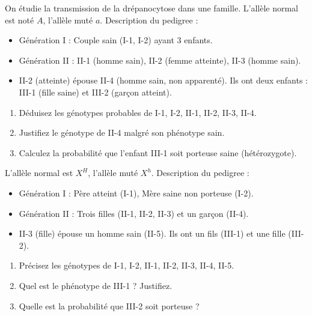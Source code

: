 \documentclass[11pt]{article}
\begin{document}
\begin{exercice}
On étudie la transmission de la drépanocytose dans une famille. L'allèle normal est noté $A$, l'allèle muté $a$.
Description du pedigree :
\begin{itemize}
    \item Génération I : Couple sain (I-1, I-2) ayant 3 enfants.
    \item Génération II : II-1 (homme sain), II-2 (femme atteinte), II-3 (homme sain).
    \item II-2 (atteinte) épouse II-4 (homme sain, non apparenté). Ils ont deux enfants : III-1 (fille saine) et III-2 (garçon atteint).
\end{itemize}
\begin{enumerate}
    \item Déduisez les génotypes probables de I-1, I-2, II-1, II-2, II-3, II-4.
    \item Justifiez le génotype de II-4 malgré son phénotype sain.
    \item Calculez la probabilité que l'enfant III-1 soit porteuse saine (hétérozygote).
\end{enumerate}
\end{exercice}

\begin{exercice}
L'allèle normal est $X^H$, l'allèle muté $X^h$.
Description du pedigree :
\begin{itemize}
    \item Génération I : Père atteint (I-1), Mère saine non porteuse (I-2).
    \item Génération II : Trois filles (II-1, II-2, II-3) et un garçon (II-4).
    \item II-3 (fille) épouse un homme sain (II-5). Ils ont un fils (III-1) et une fille (III-2).
\end{itemize}
\begin{enumerate}
    \item Précisez les génotypes de I-1, I-2, II-1, II-2, II-3, II-4, II-5.
    \item Quel est le phénotype de III-1 ? Justifiez.
    \item Quelle est la probabilité que III-2 soit porteuse ?
\end{enumerate}
\end{exercice}
\end{document}

